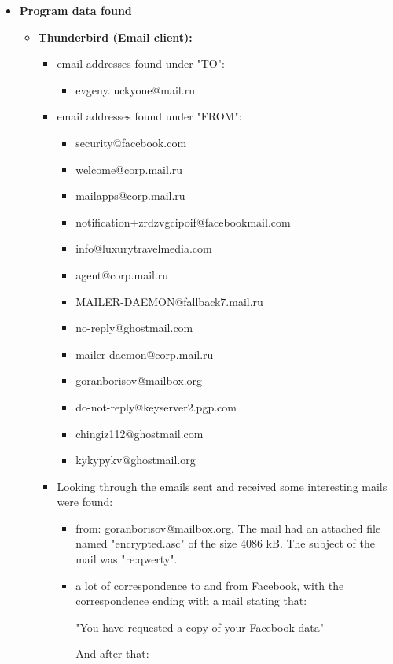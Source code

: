 \begin{enumerate}
\begin{itemize}
	\newpage
	\item \textbf{Program data found}
	\begin{itemize}
		\item \textbf{Thunderbird (Email client):} 
		\begin{itemize}
			\item email addresses found under "TO":
			\begin{itemize}
				\item evgeny.luckyone@mail.ru
			\end{itemize}
			\item email addresses found under "FROM":
			\begin{itemize}
				\item security@facebook.com
				\item welcome@corp.mail.ru
				\item mailapps@corp.mail.ru
				\item notification+zrdzvgcipoif@facebookmail.com
				\item info@luxurytravelmedia.com
				\item agent@corp.mail.ru
				\item MAILER-DAEMON@fallback7.mail.ru
				\item no-reply@ghostmail.com
				\item mailer-daemon@corp.mail.ru
				\item goranborisov@mailbox.org
				\item do-not-reply@keyserver2.pgp.com
				\item chingiz112@ghostmail.com
				\item kykypykv@ghostmail.org
			\end{itemize}
			
			\item Looking through the emails sent and received some interesting mails were found: 
			
			\begin{itemize}
				\item from: goranborisov@mailbox.org. The mail had an attached file named "encrypted.asc" of the size 4086 kB. The subject of the mail was "re:qwerty". 
				
				\item a lot of correspondence to and from Facebook, with the correspondence ending with a mail stating that:
				
				"You have requested a copy of your Facebook data"
				
				And after that:
				

\end{itemize}
\end{itemize}
\end{itemize}
\end{itemize}
\end{enumerate}

